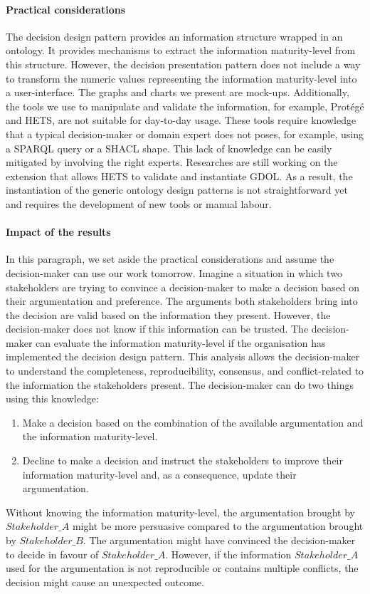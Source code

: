 \paragraph{Practical considerations}
The decision design pattern provides an information structure wrapped in an ontology. It provides mechanisms to extract the information maturity-level from this structure. However, the decision presentation pattern does not include a way to transform the numeric values representing the information maturity-level into a user-interface. The graphs and charts we present are mock-ups. Additionally, the tools we use to manipulate and validate the information, for example, Prot\'eg\'e and HETS, are not suitable for day-to-day usage. These tools require knowledge that a typical decision-maker or domain expert does not poses, for example, using a SPARQL query or a SHACL shape. This lack of knowledge can be easily mitigated by involving the right experts. Researches are still working on the extension that allows HETS to validate and instantiate GDOL. As a result, the instantiation of the generic ontology design patterns is not straightforward yet and requires the development of new tools or manual labour.

\paragraph{Impact of the results}
In this paragraph, we set aside the practical considerations and assume the decision-maker can use our work tomorrow. Imagine a situation in which two stakeholders are trying to convince a decision-maker to make a decision based on their argumentation and preference. The arguments both stakeholders bring into the decision are valid based on the information they present. However, the decision-maker does not know if this information can be trusted. The decision-maker can evaluate the information maturity-level if the organisation has implemented the decision design pattern. This analysis allows the decision-maker to understand the completeness, reproducibility, consensus, and conflict-related to the information the stakeholders present. The decision-maker can do two things using this knowledge:
\begin{enumerate}
\item Make a decision based on the combination of the available argumentation and the information maturity-level. 
\item Decline to make a decision and instruct the stakeholders to improve their information maturity-level and, as a consequence, update their argumentation.
\end{enumerate}
Without knowing the information maturity-level, the argumentation brought by $Stakeholder\_A$ might be more persuasive compared to the argumentation brought by $Stakeholder\_B$. The argumentation might have convinced the decision-maker to decide in favour of $Stakeholder\_A$. However, if the information $Stakeholder\_A$ used for the argumentation is not reproducible or contains multiple conflicts, the decision might cause an unexpected outcome.

